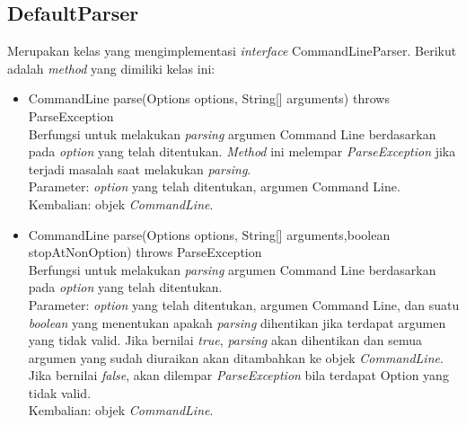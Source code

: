 \subsection{DefaultParser}
\label{subsec:defaultparser}
Merupakan kelas yang mengimplementasi \textit{interface} CommandLineParser. Berikut adalah \textit{method} yang dimiliki kelas ini:
\begin{itemize}
\item CommandLine parse(Options options, String[] arguments) throws ParseException\\
Berfungsi untuk melakukan \textit{parsing} argumen Command Line berdasarkan pada \textit{option} yang telah ditentukan. \textit{Method} ini melempar \textit{ParseException} jika terjadi masalah saat melakukan \textit{parsing}.\\
Parameter: \textit{option} yang telah ditentukan, argumen Command Line.\\
Kembalian: objek \textit{CommandLine}.

\item CommandLine parse(Options options, String[] arguments,boolean stopAtNonOption) throws ParseException\\
Berfungsi untuk melakukan \textit{parsing} argumen Command Line berdasarkan pada \textit{option} yang telah ditentukan.\\
Parameter: \textit{option} yang telah ditentukan, argumen Command Line, dan suatu \textit{boolean} yang menentukan apakah \textit{parsing} dihentikan jika terdapat argumen yang tidak valid. Jika bernilai \textit{true}, \textit{parsing} akan dihentikan dan semua argumen yang sudah diuraikan akan ditambahkan ke objek \textit{CommandLine}. Jika bernilai \textit{false}, akan dilempar \textit{ParseException} bila terdapat Option yang tidak valid.\\
Kembalian: objek \textit{CommandLine}.
\end{itemize}


